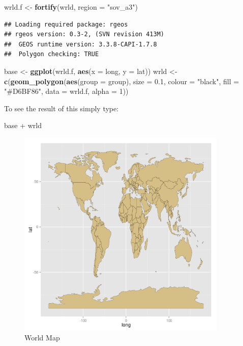 \documentclass[]{article}
\newenvironment{Shaded}{}{}
\newcommand{\KeywordTok}[1]{\textcolor[rgb]{0.00,0.44,0.13}{\textbf{{#1}}}}
\newcommand{\DataTypeTok}[1]{\textcolor[rgb]{0.56,0.13,0.00}{{#1}}}
\newcommand{\DecValTok}[1]{\textcolor[rgb]{0.25,0.63,0.44}{{#1}}}
\newcommand{\FloatTok}[1]{\textcolor[rgb]{0.25,0.63,0.44}{{#1}}}
\newcommand{\StringTok}[1]{\textcolor[rgb]{0.25,0.44,0.63}{{#1}}}
\newcommand{\NormalTok}[1]{{#1}}
\let\Oldincludegraphics\includegraphics
\renewcommand{\includegraphics}[1]{\Oldincludegraphics[width=10cm]{#1}}
\begin{document}
\begin{Shaded}
\begin{Highlighting}[]
\NormalTok{wrld.f <- }\KeywordTok{fortify}\NormalTok{(wrld, }\DataTypeTok{region =} \StringTok{"sov_a3"}\NormalTok{)}
\end{Highlighting}
\end{Shaded}
\begin{verbatim}
## Loading required package: rgeos
## rgeos version: 0.3-2, (SVN revision 413M)
##  GEOS runtime version: 3.3.8-CAPI-1.7.8 
##  Polygon checking: TRUE
\end{verbatim}
\begin{Shaded}
\begin{Highlighting}[]
\NormalTok{base <- }\KeywordTok{ggplot}\NormalTok{(wrld.f, }\KeywordTok{aes}\NormalTok{(}\DataTypeTok{x =} \NormalTok{long, }\DataTypeTok{y =} \NormalTok{lat))}
\NormalTok{wrld <- }\KeywordTok{c}\NormalTok{(}\KeywordTok{geom_polygon}\NormalTok{(}\KeywordTok{aes}\NormalTok{(}\DataTypeTok{group =} \NormalTok{group), }\DataTypeTok{size =} \FloatTok{0.1}\NormalTok{, }\DataTypeTok{colour =} \StringTok{"black"}\NormalTok{, }\DataTypeTok{fill =} \StringTok{"#D6BF86"}\NormalTok{, }
    \DataTypeTok{data =} \NormalTok{wrld.f, }\DataTypeTok{alpha =} \DecValTok{1}\NormalTok{))}
\end{Highlighting}
\end{Shaded}
To see the result of this simply type:

\begin{Shaded}
\begin{Highlighting}[]
\NormalTok{base + wrld}
\end{Highlighting}
\end{Shaded}
\begin{figure}[htbp]
\centering
\includegraphics{figure/World_Map.png}
\caption{World Map}
\end{figure}
\end{document}
